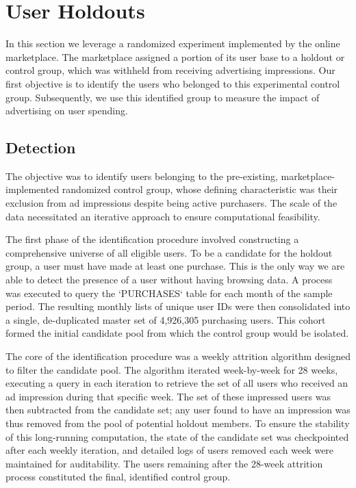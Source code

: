 \section*{User Holdouts}

In this section we leverage a randomized experiment implemented by the online marketplace. The marketplace assigned a portion of its user base to a holdout or control group, which was withheld from receiving advertising impressions. Our first objective is to identify the users who belonged to this experimental control group. Subsequently, we use this identified group to measure the impact of advertising on user spending.

\subsection*{Detection}

The objective was to identify users belonging to the pre-existing, marketplace-implemented randomized control group, whose defining characteristic was their exclusion from ad impressions despite being active purchasers. The scale of the data necessitated an iterative approach to ensure computational feasibility.

The first phase of the identification procedure involved constructing a comprehensive universe of all eligible users. To be a candidate for the holdout group, a user must have made at least one purchase. This is the only way we are able to detect the presence of a user without having browsing data. A process was executed to query the `PURCHASES` table for each month of the sample period. The resulting monthly lists of unique user IDs were then consolidated into a single, de-duplicated master set of 4,926,305 purchasing users. This cohort formed the initial candidate pool from which the control group would be isolated.

The core of the identification procedure was a weekly attrition algorithm designed to filter the candidate pool. The algorithm iterated week-by-week for 28 weeks, executing a query in each iteration to retrieve the set of all users who received an ad impression during that specific week. The set of these impressed users was then subtracted from the candidate set; any user found to have an impression was thus removed from the pool of potential holdout members. To ensure the stability of this long-running computation, the state of the candidate set was checkpointed after each weekly iteration, and detailed logs of users removed each week were maintained for auditability. The users remaining after the 28-week attrition process constituted the final, identified control group.

